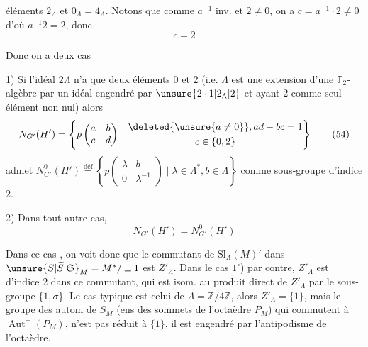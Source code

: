 éléments $2_\Lambda$ et $0_\Lambda=4_\Lambda$. Notons que comme
$a^{-1}$ inv. et $2\ne0$, on a $c=a^{-1}\cdot2\ne0$ d'où $a^{-1}2=2$,
donc
\[
c=2
\]

Donc on a deux cas

1) Si  l'idéal
$2\Lambda$ n'a que deux éléments $0$ et $2$ (i.e.
$\Lambda$ est une extension d'une $\mathbb F_2$-algèbre  par
un idéal engendré par $\unsure{2\cdot1|2_\Lambda|2}$ et ayant $2$ comme
seul élément non nul) alors
\[
N_{G'}(H')=\left\{p\begin{pmatrix}a&b\\c&d\end{pmatrix}\ \middle|\ 
\begin{gathered}\deleted{\unsure{a\ne0}},ad-bc=1\\c\in\{0,2\}\end{gathered}\right\}\tag*{(54)}
\]
admet $N^0_{G'}(H')\overset{\text{déf}}{=}\left\{p\left(\begin{smallmatrix}\lambda&b\\0&\lambda^{-1}\end{smallmatrix}\right)\mid\lambda\in\Lambda^*,b\in\Lambda\right\}$
comme sous-groupe d'indice $2$.
\margin{en fait, si $\sigma=p\left(\begin{smallmatrix}1&0\\2&1\end{smallmatrix}\right)$ alors $N_{G'}(H')$ est produit \inserted{$1/2$ direct} de $N^0_{G'}(H')$ par $\{1,\sigma\}$. [Le $\sigma$ ou antipodisme a un sens intrinsèque, indépend$^{\text{mt}}$ du choix d'une base}

2) Dans tout autre cas, 
\[
N_{G'}(H')=N^0_{G'}(H')\tag*{(55)}
\]

Dans ce cas , on voit donc que le commutant
de $\mathrm{Sl}_\Lambda(M)'$ dans $\unsure{S|\widetilde S|\mathfrak S}_M=M^*/\pm1$ est $Z'_\Lambda$.
Dans le cas $1^\circ$) par contre, $Z'_\Lambda$ est d'indice
$2$ dans ce commutant, qui est isom. au
produit direct  de $Z'_\Lambda$ par le sous-groupe
$\{1,\sigma\}$. Le cas typique est celui de
$\Lambda=\mathbb Z/4\mathbb Z$,  alors $Z'_\Lambda=\{1\}$,
mais le groupe des autom de $S_M$ (ens des
sommets de l'octaèdre $P_M$) qui commutent à
$\operatorname{Aut}^{+}(P_M)$, n'est pas réduit à $\{1\}$, il est engendré
par l'antipodisme de l'octaèdre.
